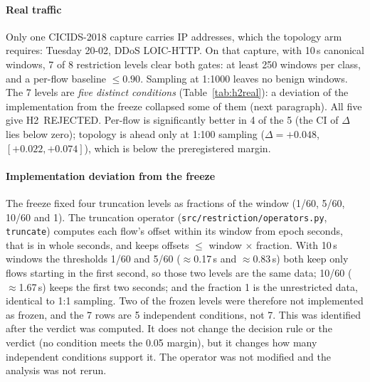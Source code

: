 \documentclass[preprint,12pt]{elsarticle}
\begin{document}
\paragraph{Real traffic} Only one CICIDS-2018 capture carries IP addresses, which the topology arm requires: Tuesday 20-02, DDoS LOIC-HTTP. On that capture, with 10\,s canonical windows, 7 of 8 restriction levels clear both gates: at least 250 windows per class, and a per-flow baseline $\le 0.90$. Sampling at 1:1000 leaves no benign windows. The 7 levels are \emph{five distinct conditions} (Table~\ref{tab:h2real}): a deviation of the implementation from the freeze collapsed some of them (next paragraph). All five give H2~REJECTED. Per-flow is significantly better in 4 of the 5 (the CI of $\Delta$ lies below zero); topology is ahead only at 1:100 sampling ($\Delta=+0.048$, $[+0.022, +0.074]$), which is below the preregistered margin.

\paragraph{Implementation deviation from the freeze}
The freeze fixed four truncation levels as fractions of the window (1/60, 5/60, 10/60 and 1). The truncation operator (\texttt{src/restriction/operators.py}, \texttt{truncate}) computes each flow's offset within its window from epoch seconds, that is in whole seconds, and keeps offsets $\le$ window $\times$ fraction. With 10\,s windows the thresholds 1/60 and 5/60 ($\approx$0.17\,s and $\approx$0.83\,s) both keep only flows starting in the first second, so those two levels are the same data; 10/60 ($\approx$1.67\,s) keeps the first two seconds; and the fraction 1 is the unrestricted data, identical to 1:1 sampling. Two of the frozen levels were therefore not implemented as frozen, and the 7 rows are 5 independent conditions, not 7. This was identified after the verdict was computed. It does not change the decision rule or the verdict (no condition meets the 0.05 margin), but it changes how many independent conditions support it. The operator was not modified and the analysis was not rerun.
\end{document}
